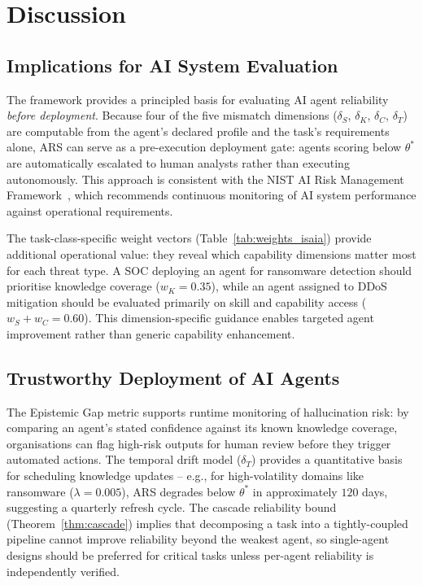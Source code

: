 \section{Discussion}
\label{sec:discussion}

\subsection{Implications for AI System Evaluation}

The \ARES{} framework provides a principled basis for evaluating AI agent
reliability \textit{before deployment}. Because four of the five mismatch
dimensions ($\delta_S$, $\delta_K$, $\delta_C$, $\delta_T$) are computable
from the agent's declared profile and the task's requirements alone, ARS
can serve as a pre-execution deployment gate: agents scoring below $\theta^*$
are automatically escalated to human analysts rather than executing
autonomously. This approach is consistent with the NIST AI Risk Management
Framework~\cite{nist_ai_rmf}, which recommends continuous monitoring of AI
system performance against operational requirements.

The task-class-specific weight vectors (Table~\ref{tab:weights_isaia})
provide additional operational value: they reveal which capability
dimensions matter most for each threat type. A SOC deploying an agent for
ransomware detection should prioritise knowledge coverage ($w_K = 0.35$),
while an agent assigned to DDoS mitigation should be evaluated primarily
on skill and capability access ($w_S + w_C = 0.60$). This dimension-specific
guidance enables targeted agent improvement rather than generic capability
enhancement.

\subsection{Trustworthy Deployment of AI Agents}

The Epistemic Gap metric supports runtime monitoring of hallucination
risk: by comparing an agent's stated confidence against its known
knowledge coverage, organisations can flag high-risk outputs for human
review before they trigger automated actions. The temporal drift model
($\delta_T$) provides a quantitative basis for scheduling knowledge
updates -- e.g., for high-volatility domains like ransomware
($\lambda = 0.005$), ARS degrades below $\theta^*$ in approximately
$120$ days, suggesting a quarterly refresh cycle. The cascade
reliability bound (Theorem~\ref{thm:cascade}) implies that decomposing
a task into a tightly-coupled pipeline cannot improve reliability beyond
the weakest agent, so single-agent designs should be preferred for
critical tasks unless per-agent reliability is independently verified.

